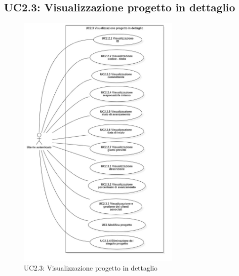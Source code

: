 \pagebreak

\subsection{UC2.3: Visualizzazione progetto in dettaglio}
\begin{figure}[!h]
\centering
\includegraphics[width=300px]{../images/UC/.jpeg/UC2.3-visualizzazioneDettaglioProgetto.jpg}
\caption{UC2.3: Visualizzazione progetto in dettaglio}
\end{figure}

